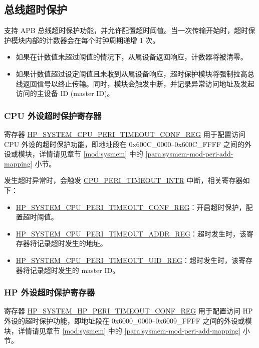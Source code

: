 \documentclass[main\_\_CN.tex]{subfiles}
\begin{document}
\subsection{总线超时保护}

\chipname{} 支持 APB 总线超时保护功能，并允许配置超时阈值。当一次传输开始时，超时保护模块内部的计数器会在每个时钟周期递增 1 次。
\begin{itemize}
    \item 如果在计数值未超过阈值的情况下，从属设备返回响应，计数器将被清零。
    \item 如果计数值超过设定阈值且未收到从属设备响应，超时保护模块将强制拉高总线返回信号以终止传输。同时，模块会触发中断，并记录异常访问地址及发起访问的主设备 ID (master ID)。
\end{itemize}


\subsubsection{CPU 外设超时保护寄存器}

寄存器 \hyperref[regdesc:HPSYSTEMCPUPERITIMEOUTCONFREG]{HP\_SYSTEM\_CPU\_PERI\_TIMEOUT\_CONF\_REG} 用于配置访问 CPU 外设的超时保护功能，即地址段在 0x600C\_0000–0x600C\_FFFF 之间的外设或模块，详情请见章节 \ref{mod:sysmem} \textit{} 中的 \ref{para:sysmem-mod-peri-add-mapping} \textit{} 小节。

发生超时异常时，会触发 \hyperref[tab:peripheral-interrupt-config-status-source]{CPU\_PERI\_TIMEOUT\_INTR} 中断，相关寄存器如下：

\begin{itemize}
    \item \hyperref[regdesc:HPSYSTEMCPUPERITIMEOUTCONFREG]{HP\_SYSTEM\_CPU\_PERI\_TIMEOUT\_CONF\_REG}：开启超时保护，配置超时阈值。
    \item \hyperref[regdesc:HPSYSTEMCPUPERITIMEOUTADDRREG]{HP\_SYSTEM\_CPU\_PERI\_TIMEOUT\_ADDR\_REG}：超时发生时，该寄存器将记录超时发生的地址。
    \item \hyperref[regdesc:HPSYSTEMCPUPERITIMEOUTUIDREG]{HP\_SYSTEM\_CPU\_PERI\_TIMEOUT\_UID\_REG}：超时发生时，该寄存器将记录超时发生的 master ID。
\end{itemize}


\subsubsection{HP 外设超时保护寄存器}

寄存器 \hyperref[regdesc:HPSYSTEMHPPERITIMEOUTCONFREG]{HP\_SYSTEM\_HP\_PERI\_TIMEOUT\_CONF\_REG} 用于配置访问 HP 外设的超时保护功能，即地址段在 0x6000\_0000–0x6009\_FFFF 之间的外设或模块，详情请见章节 \ref{mod:sysmem} \textit{} 中的 \ref{para:sysmem-mod-peri-add-mapping} \textit{} 小节。
\end{document}
